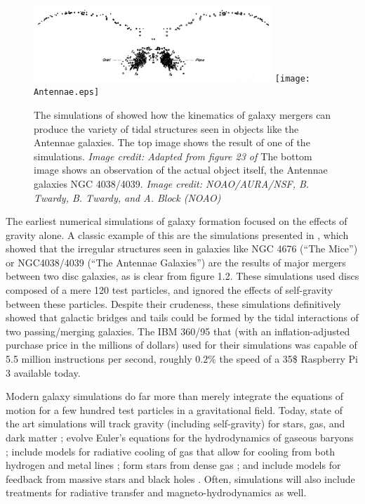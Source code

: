 \begin{figure}
    \includegraphics[width=0.8\textwidth]{Toomre.eps}
    \texttt{[image: Antennae.eps]}
    \caption[Early simulation of Antennae Galaxies]{The simulations of
    \citet{Toomre1972} showed how the kinematics of galaxy mergers can produce
    the variety of tidal structures seen in objects like the Antennae galaxies.
    The top image shows the result of one of the \citet{Toomre1972} simulations.
    \textit{Image credit: Adapted from figure 23 of \citet{Toomre1972}}
    The bottom image shows an observation of the actual object itself, the
    Antennae galaxies NGC 4038/4039. \textit{Image credit: NOAO/AURA/NSF, B.
    Twardy, B. Twardy, and A. Block (NOAO)}}
\end{figure}

The earliest numerical simulations of galaxy formation focused on the effects of
gravity alone.  A classic example of this are the simulations presented in
\citet{Toomre1972}, which showed that the irregular structures seen in galaxies
like NGC 4676 (``The Mice'') or NGC4038/4039 (``The Antennae Galaxies'') are the
results of major mergers between two disc galaxies, as is clear from figure 1.2.
These simulations used discs composed of a mere 120 test particles, and ignored
the effects of self-gravity between these particles.  Despite their crudeness,
these simulations definitively showed that galactic bridges and tails could be
formed by the tidal interactions of two passing/merging galaxies.  The IBM
360/95 that \citet{Toomre1972} (with an inflation-adjusted purchase price in the
millions of dollars) used for their simulations was capable of 5.5 million
instructions per second, roughly $0.2\%$ the speed of a 35\$ Raspberry Pi 3
available today.

Modern galaxy simulations do far more than merely integrate the equations of
motion for a few hundred test particles in a gravitational field.  Today, state
of the art simulations will track gravity (including self-gravity) for stars,
gas, and dark matter \citep{Aarseth1980,Stadel2001,Dehnen2002}; evolve Euler's
equations for the hydrodynamics of gaseous baryons
\citep{Wadsley2004,Teyssier2002,Bryan2014}; include models for radiative
cooling of gas that allow for cooling from both hydrogen and metal lines
\citep{Marri2003,Shen2010}; form stars from dense gas
\citep{Katz1992,Agertz2015}; and include models for feedback from massive stars
and black holes \citep{Katz1992,Springel2003,DiMatteo2005}.  Often, simulations
will also include treatments for radiative transfer
\citep{Gendelev2012,Krumholz2013} and magneto-hydrodynamics
\citep{Girichidis2015} as well.

